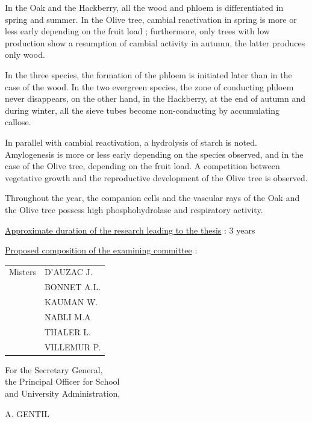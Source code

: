 In the Oak and the Hackberry, all the wood and phloem is differentiated in spring and summer. In the Olive tree, cambial reactivation in spring is more or less early depending on the fruit load ; furthermore, only trees with low production show a resumption of cambial activity in autumn, the latter produces only wood.

In the three species, the formation of the phloem is initiated later than in the case of the wood. In the two evergreen species, the zone of conducting phloem never disappears, on the other hand, in the Hackberry, at the end of autumn and during winter, all the sieve tubes become non-conducting by accumulating callose.

In parallel with cambial reactivation, a hydrolysis of starch is noted. Amylogenesis is more or less early depending on the species observed, and in the case of the Olive tree, depending on the fruit load. A competition between vegetative growth and the reproductive development of the Olive tree is observed.

Throughout the year, the companion cells and the vascular rays of the Oak and the Olive tree possess high phosphohydrolase and respiratory activity.

\uline{Approximate duration of the research leading to the thesis} : 3 years

\uline{Proposed composition of the examining committee} :

\begin{tabular}{ll}
Misters & D'AUZAC J.\\
& BONNET A.L.\\
& KAUMAN W.\\
& NABLI M.A\\
& THALER L.\\
& VILLEMUR P.
\end{tabular}

\begin{center}
For the Secretary General,\\
the Principal Officer for School\\
and University Administration,


A. GENTIL
\end{center}

